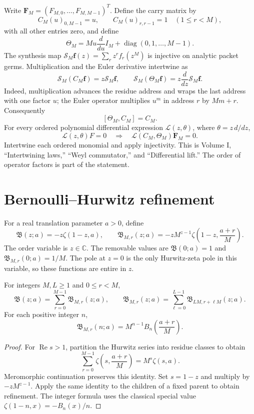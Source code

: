 Write $\boldsymbol F_M=(F_{M,0},\ldots,F_{M,M-1})^T$. Define the carry matrix by
\[
C_M(u)_{0,M-1}=u,
\qquad C_M(u)_{r,r-1}=1\quad(1\le r<M),
\]
with all other entries zero, and define
\[
\Theta_M=Mu\frac{d}{du}I_M+
\operatorname{diag}(0,1,\ldots,M-1).
\]
The synthesis map $\mathcal S_M\boldsymbol f(z)=\sum_rz^rf_r(z^M)$ is injective on analytic packet germs. Multiplication and the Euler derivative intertwine as
\[
\mathcal S_M(C_M\boldsymbol f)=z\mathcal S_M\boldsymbol f,
\qquad
\mathcal S_M(\Theta_M\boldsymbol f)=
z\frac{d}{dz}\mathcal S_M\boldsymbol f.
\]
Indeed, multiplication advances the residue address and wraps the last address with one factor $u$; the Euler operator multiplies $u^m$ in address $r$ by $Mm+r$. Consequently
\[
[\Theta_M,C_M]=C_M.
\]
For every ordered polynomial differential expression $\mathcal L(z,\theta)$, where $\theta=z\,d/dz$,
\[
\mathcal L(z,\theta)F=0
\quad\Longrightarrow\quad
\mathcal L(C_M,\Theta_M)\boldsymbol F_M=0.
\]
Intertwine each ordered monomial and apply injectivity. This is Volume I, ``Intertwining laws,'' ``Weyl commutator,'' and ``Differential lift.'' The order of operator factors is part of the statement.

\section{Bernoulli--Hurwitz refinement}

For a real translation parameter $a>0$, define
\[
\mathfrak B(z;a)=-z\zeta(1-z,a),
\qquad
\mathfrak B_{M,r}(z;a)=
-zM^{z-1}\zeta\!\left(1-z,\frac{a+r}{M}\right).
\]
The order variable is $z\in\mathbb C$. The removable values are
$\mathfrak B(0;a)=1$ and $\mathfrak B_{M,r}(0;a)=1/M$.
The pole at $z=0$ is the only Hurwitz-zeta pole in this variable, so these functions are entire in $z$.

\begin{proposition}
For integers $M,L\ge1$ and $0\le r<M$,
\[
\mathfrak B(z;a)=\sum_{r=0}^{M-1}\mathfrak B_{M,r}(z;a),
\qquad
\mathfrak B_{M,r}(z;a)=
\sum_{\ell=0}^{L-1}\mathfrak B_{LM,r+\ell M}(z;a).
\]
For each positive integer $n$,
\[
\mathfrak B_{M,r}(n;a)=
M^{n-1}B_n\!\left(\frac{a+r}{M}\right).
\]
\end{proposition}
\begin{proof}
For $\operatorname{Re}s>1$, partition the Hurwitz series into residue classes to obtain
\[
\sum_{r=0}^{M-1}\zeta\!\left(s,\frac{a+r}{M}\right)
=M^s\zeta(s,a).
\]
Meromorphic continuation preserves this identity. Set $s=1-z$ and multiply by $-zM^{z-1}$. Apply the same identity to the children of a fixed parent to obtain refinement. The integer formula uses the classical special value $\zeta(1-n,x)=-B_n(x)/n$.
\end{proof}

